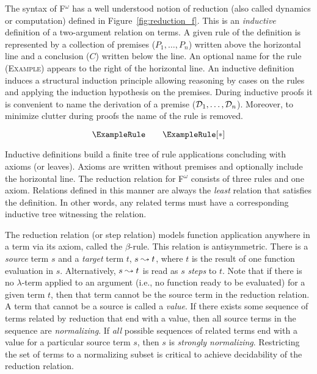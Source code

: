

The syntax of F$^\omega$ has a well understood notion of reduction (also called dynamics or computation) defined in Figure~\ref{fig:reduction_f}.
This is an \textit{inductive} definition of a two-argument relation on terms.
A given rule of the definition is represented by a collection of premises ($P_1, \ldots, P_n$) written above the horizontal line and a conclusion ($C$) written below the line.
An optional name for the rule (\textsc{Example}) appears to the right of the horizontal line.
An inductive definition induces a structural induction principle allowing reasoning by cases on the rules and applying the induction hypothesis on the premises.
During inductive proofs it is convenient to name the derivation of a premise ($\mathcal{D}_{1}, \ldots, \mathcal{D}_{n}$).
Moreover, to minimize clutter during proofs the name of the rule is removed.

$$\ExampleRule \quad\quad \ExampleRule[*]$$

Inductive definitions build a finite tree of rule applications concluding with axioms (or leaves).
Axioms are written without premises and optionally include the horizontal line.
The reduction relation for F$^\omega$ consists of three rules and one axiom.
Relations defined in this manner are always the \textit{least} relation that satisfies the definition.
In other words, any related terms must have a corresponding inductive tree witnessing the relation.

The reduction relation (or step relation) models function application anywhere in a term via its axiom, called the $\beta$-rule.
This relation is antisymmetric.
There is a \textit{source} term $s$ and a \textit{target} term $t$, $s \leadsto t$, where $t$ is the result of one function evaluation in $s$.
Alternatively, $s \leadsto t$ is read as $s$ \textit{steps} to $t$.
Note that if there is no $\lambda$-term applied to an argument (i.e., no function ready to be evaluated) for a given term $t$, then that term cannot be the source term in the reduction relation.
A term that cannot be a source is called a \textit{value}.
If there exists some sequence of terms related by reduction that end with a value, then all source terms in the sequence are \textit{normalizing}.
If \textit{all} possible sequences of related terms end with a value for a particular source term $s$, then $s$ is \textit{strongly normalizing}.
Restricting the set of terms to a normalizing subset is critical to achieve decidability of the reduction relation.

